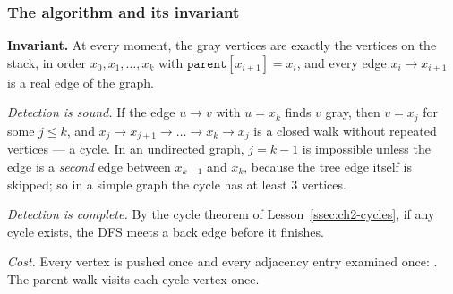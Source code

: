 \subsubsection*{The algorithm and its invariant}

\begin{invariantbox}
\textbf{Invariant.} At every moment, the gray vertices are exactly the vertices on the stack, in order $x_0, x_1, \dots, x_k$ with $\texttt{parent}[x_{i+1}] = x_i$, and every edge $x_i \to x_{i+1}$ is a real edge of the graph.

\emph{Detection is sound.} If the edge $u \to v$ with $u = x_k$ finds $v$ gray, then $v = x_j$ for some $j \le k$, and $x_j \to x_{j+1} \to \dots \to x_k \to x_j$ is a closed walk without repeated vertices --- a cycle. In an undirected graph, $j = k-1$ is impossible unless the edge is a \emph{second} edge between $x_{k-1}$ and $x_k$, because the tree edge itself is skipped; so in a simple graph the cycle has at least 3 vertices.

\emph{Detection is complete.} By the cycle theorem of Lesson~\ref{ssec:ch2-cycles}, if any cycle exists, the DFS meets a back edge before it finishes.

\emph{Cost.} Every vertex is pushed once and every adjacency entry examined once: \VE. The parent walk visits each cycle vertex once.
\end{invariantbox}

